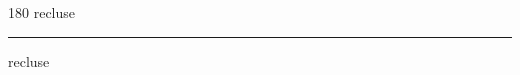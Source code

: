 
\begin{frame}
\begin{center}
\begin{turn}{180}
{\fontsize{2.5cm}{1em}\selectfont recluse}
\end{turn}
\vspace{1em}\par  
\hrule
\vspace{1em}\par  
{\fontsize{2.5cm}{1em}\selectfont recluse}
\end{center}
\end{frame}
